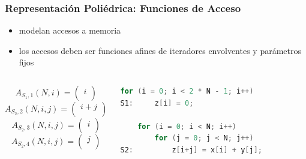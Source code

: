 \documentclass{beamer}\usetheme{Madrid} %
\begin{document}
\begin{frame}[fragile]
\frametitle{Representación Poliédrica: Funciones de Acceso}
\begin{itemize}
\item modelan accesos a memoria
\item los accesos deben ser funciones afines de iteradores envolventes
y parámetros fijos
\end{itemize}
\begin{columns}
\begin{equation}
\nonumber
A_{{S_1},1}(N, i) = \left(\begin{matrix} i\\\end{matrix} \right)
\end{equation}
\begin{equation}
\nonumber
A_{{S_2},2}(N, i, j) =  \left(\begin{matrix} i + j \\\end{matrix} \right)
\end{equation}
\begin{equation}
\nonumber
A_{{S_2},3}(N, i, j) =  \left(\begin{matrix} i \\\end{matrix} \right)
\end{equation}
\begin{equation}
\nonumber
A_{{S_2},4}(N, i, j) =  \left(\begin{matrix} j \\\end{matrix} \right)
\end{equation}
\begin{block}{}
\begin{lstlisting}[basicstyle=\scriptsize,language=C]
    for (i = 0; i < 2 * N - 1; i++) 
S1:     z[i] = 0;
        
    for (i = 0; i < N; i++) 
        for (j = 0; j < N; j++)
S2:         z[i+j] = x[i] + y[j];
\end{lstlisting}
\end{block}
\vfill \null
\end{columns}
\end{frame}
\end{document}
